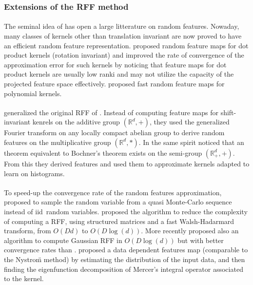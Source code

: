 \subsubsection{Extensions of the RFF method}
\paragraph{}
The seminal idea of \citet{Rahimi2007} has open a large litterature on random
features. Nowaday, many classes of kernels other than translation invariant are
now proved to have an efficient random feature representation.
\citet{kar2012random} proposed random feature maps for dot product kernels
(rotation invariant) and \citet{hamid2014compact} improved the rate of
convergence of the approximation error for such kernels by noticing that
feature maps for dot product kernels are usually low ranki and may not utilize
the capacity of the projected feature  space  effectively. 
proposed fast random feature maps for polynomial kernels.
\paragraph{}
 generalized the original \acs{RFF} of \citet{Rahimi2007}.
Instead of computing feature maps for shift-invariant kenrels on the additive
group $(\mathbb{R}^d, +)$, they used the generalized Fourier transform on any
locally compact abelian group to derive random features on the multiplicative
group $(\mathbb{R}^d, *)$. In the same spirit \citet{yang2014random} noticed
that an theorem equivalent to Bochner's theorem exists on the semi-group
$(\mathbb{R}_+^d, +)$. From this they derived  features and
used them to approximate kernels adapted to learn on histograms.
\paragraph{}
To speed-up the convergence rate of the random features approximation,
\citet{yang2014quasi} proposed to sample the random variable from a quasi
Monte-Carlo sequence instead of \acs{iid}~random variables. 
proposed the  algorithm to reduce the complexity of computing a
\acs{RFF}, using structured matrices and a fast Walsh-Hadarmard transform, from
$O(Dd)$ to $O(D\log(d))$. More recently \citet{felix2016orthogonal} proposed
also an algorithm  to compute Gaussian \acs{RFF} in $O(D\log(d))$ but
with better convergence rates than  \citep{Le2013}.
 proposed a data dependent features map (comparable to
the Nystro\"m method) by estimating the distribution of the input data, and
then finding the eigenfunction decomposition of Mercer's integral operator
associated to the kernel.
